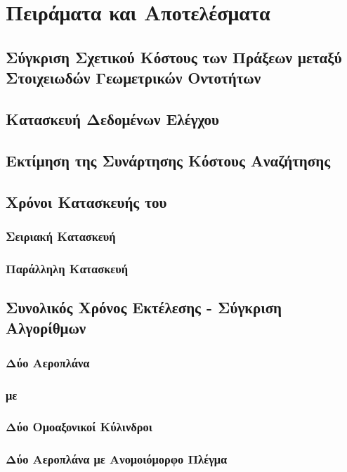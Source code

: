 \chapter{Πειράματα και Αποτελέσματα}

\section{Σύγκριση Σχετικού Κόστους των Πράξεων μεταξύ Στοιχειωδών Γεωμετρικών Οντοτήτων}

\section{Κατασκευή Δεδομένων Ελέγχου}

\section{Εκτίμηση της Συνάρτησης Κόστους Αναζήτησης}

\section{Χρόνοι Κατασκευής του }
\subsection{Σειριακή Κατασκευή}
\subsection{Παράλληλη Κατασκευή}

\section{Συνολικός Χρόνος Εκτέλεσης - Σύγκριση Αλγορίθμων}
\subsection{Δύο Αεροπλάνα}
\subsection{ με }
\subsection{Δύο Ομοαξονικοί Κύλινδροι}
\subsection{Δύο Αεροπλάνα με Ανομοιόμορφο Πλέγμα}